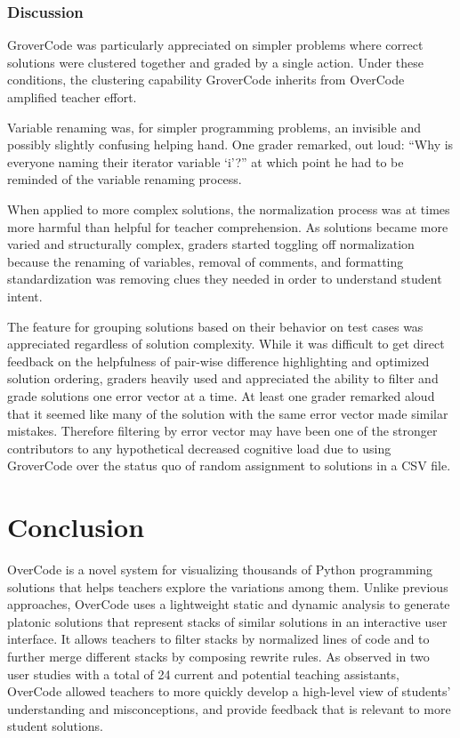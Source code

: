 \subsubsection{Discussion}

GroverCode was particularly appreciated on simpler problems where correct solutions were clustered together and graded by a single action. Under these conditions, the clustering capability GroverCode inherits from OverCode amplified teacher effort.

Variable renaming was, for simpler programming problems, an invisible and possibly slightly confusing helping hand. One grader remarked, out loud: ``Why is everyone naming their iterator variable `i'?'' at which point he had to be reminded of the variable renaming process. 

When applied to more complex solutions, the normalization process was at times more harmful than helpful for teacher comprehension. As solutions became more varied and structurally complex, graders started toggling off normalization because the renaming of variables, removal of comments, and formatting standardization was removing clues they needed in order to understand student intent.

The feature for grouping solutions based on their behavior on test cases was appreciated regardless of solution complexity. While it was difficult to get direct feedback on the helpfulness of pair-wise difference highlighting and optimized solution ordering, graders heavily used and appreciated the ability to filter and grade solutions one error vector at a time. At least one grader remarked aloud that it seemed like many of the solution with the same error vector made similar mistakes. Therefore filtering by error vector may have been one of the stronger contributors to any hypothetical decreased cognitive load due to using GroverCode over the status quo of random assignment to solutions in a CSV file.


\section{Conclusion}
OverCode is a novel system for visualizing thousands of Python programming solutions that helps teachers explore the variations among them. Unlike previous approaches, OverCode uses a lightweight static and dynamic analysis to generate platonic solutions that represent stacks of similar solutions in an interactive user interface. It allows teachers to filter stacks by normalized lines of code and to further merge different stacks by composing rewrite rules. As observed in two user studies with a total of 24 current and potential teaching assistants, OverCode allowed teachers to more quickly develop a high-level view of students' understanding and misconceptions, and provide feedback that is relevant to more student solutions. 

